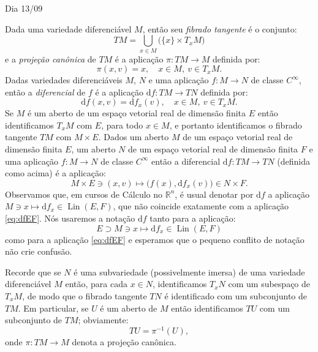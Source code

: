 \documentclass[oneside,11pt]{amsart}
\newcommand{\R}{\mathds R}
\newcommand{\dd}{\mathrm d}
\DeclareMathOperator{\Lin}{Lin}
\theoremstyle{remark}\newtheorem{exercise}{Exercício}[section]
\theoremstyle{plain}\newtheorem{teo}{Teorema}[section]
\theoremstyle{plain}\newtheorem{lem}[teo]{Lema}
\theoremstyle{plain}\newtheorem{prop}[teo]{Proposição}
\theoremstyle{definition}\newtheorem{defin}[teo]{Definição}
\theoremstyle{remark}\newtheorem{rem}[teo]{Observação}
\theoremstyle{definition}\newtheorem{example}[teo]{Exemplo}
\numberwithin{equation}{section}
\begin{document}
\begin{section}{Dia 13/09}
\label{sec:1309}

Dada uma variedade diferenciável $M$, então seu {\em fibrado tangente\/} é o conjunto:
\[TM=\bigcup_{x\in M}\big(\{x\}\times T_xM\big)\]
e a {\em projeção canônica\/} de $TM$ é a aplicação $\pi:TM\to M$ definida por:
\[\pi(x,v)=x,\quad x\in M,\ v\in T_xM.\]
Dadas variedades diferenciáveis $M$, $N$ e uma aplicação $f:M\to N$ de classe $C^\infty$, então a {\em diferencial\/} de $f$ é a aplicação $\dd f:TM\to TN$ definida por:
\[\dd f(x,v)=\dd f_x(v),\quad x\in M,\ v\in T_xM.\]
Se $M$ é um aberto de um espaço vetorial real de dimensão finita $E$ então identificamos $T_xM$ com $E$, para todo $x\in M$, e portanto identificamos
o fibrado tangente $TM$ com $M\times E$. Dados um aberto $M$ de um espaço vetorial real de dimensão finita $E$, um aberto $N$ de um espaço vetorial real de
dimensão finita $F$ e uma aplicação $f:M\to N$ de classe $C^\infty$ então a diferencial $\dd f:TM\to TN$ (definida como acima) é a aplicação:
\begin{equation}\label{eq:dfEF}
M\times E\ni(x,v)\longmapsto\big(f(x),\dd f_x(v)\big)\in N\times F.
\end{equation}
Observamos que, em cursos de Cálculo no $\R^n$, é usual denotar por $\dd f$ a aplicação $M\ni x\mapsto\dd f_x\in\Lin(E,F)$, que não coincide exatamente
com a aplicação \eqref{eq:dfEF}. Nós usaremos a notação $\dd f$ tanto para a aplicação:
\[E\supset M\ni x\longmapsto\dd f_x\in\Lin(E,F)\]
como para a aplicação \eqref{eq:dfEF} e esperamos que o pequeno conflito de notação não crie confusão.

Recorde que se $N$ é uma subvariedade (possivelmente imersa) de uma variedade diferenciável $M$ então, para cada $x\in N$, identificamos $T_xN$ com um subespaço
de $T_xM$, de modo que o fibrado tangente $TN$ é identificado com um subconjunto de $TM$. Em particular, se $U$ é um aberto de $M$ então identificamos $TU$ com
um subconjunto de $TM$; obviamente:
\[TU=\pi^{-1}(U),\]
onde $\pi:TM\to M$ denota a projeção canônica.


\end{section}
\end{document}
